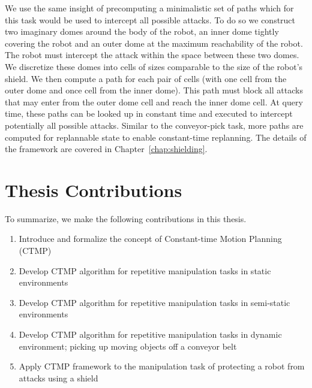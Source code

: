 \documentclass[a4paper]{report}
\begin{document}
We use the same insight of precomputing a minimalistic set of paths which for this task would be used to intercept all possible attacks. To do so we construct two imaginary domes around the body of the robot, an inner dome tightly covering the robot and an outer dome at the maximum reachability of the robot. The robot must intercept the attack within the space between these two domes.
We discretize these domes into cells of sizes comparable to the size of the robot's shield. We then compute a path for each pair of cells (with one cell from the outer dome and once cell from the inner dome). This path must block all attacks that may enter from the outer dome cell and reach the inner dome cell. At query time, these paths can be looked up in constant time and executed to intercept potentially all possible attacks.
Similar to the conveyor-pick task, more paths are computed for replannable state to enable constant-time replanning.
The details of the framework are covered in Chapter~\ref{chap:shielding}.


\section{Thesis Contributions}
To summarize, we make the following contributions in this thesis.
\begin{enumerate}
	\item Introduce and formalize the concept of Constant-time Motion Planning (CTMP)
	\item Develop CTMP algorithm for repetitive manipulation tasks in static environments
	\item Develop CTMP algorithm for repetitive manipulation tasks in semi-static environments
	\item Develop CTMP algorithm for repetitive manipulation tasks in dynamic environment; picking up moving objects off a conveyor belt
	\item Apply CTMP framework to the manipulation task of protecting a robot from attacks using a shield
\end{enumerate}
\end{document}
